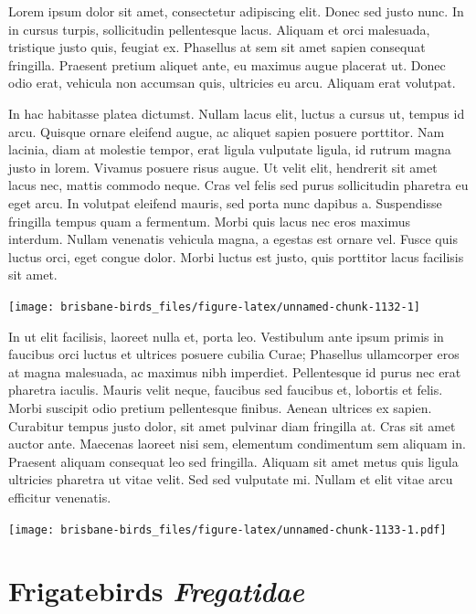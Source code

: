 \documentclass[]{book}
\let\origfigure\figure
\let\endorigfigure\endfigure
\renewenvironment{figure}[1][2] {
  \expandafter\origfigure\expandafter[H]
} {
  \endorigfigure
}
\begin{document}
Lorem ipsum dolor sit amet, consectetur adipiscing elit. Donec sed justo
nunc. In in cursus turpis, sollicitudin pellentesque lacus. Aliquam et
orci malesuada, tristique justo quis, feugiat ex. Phasellus at sem sit
amet sapien consequat fringilla. Praesent pretium aliquet ante, eu
maximus augue placerat ut. Donec odio erat, vehicula non accumsan quis,
ultricies eu arcu. Aliquam erat volutpat.

In hac habitasse platea dictumst. Nullam lacus elit, luctus a cursus ut,
tempus id arcu. Quisque ornare eleifend augue, ac aliquet sapien posuere
porttitor. Nam lacinia, diam at molestie tempor, erat ligula vulputate
ligula, id rutrum magna justo in lorem. Vivamus posuere risus augue. Ut
velit elit, hendrerit sit amet lacus nec, mattis commodo neque. Cras vel
felis sed purus sollicitudin pharetra eu eget arcu. In volutpat eleifend
mauris, sed porta nunc dapibus a. Suspendisse fringilla tempus quam a
fermentum. Morbi quis lacus nec eros maximus interdum. Nullam venenatis
vehicula magna, a egestas est ornare vel. Fusce quis luctus orci, eget
congue dolor. Morbi luctus est justo, quis porttitor lacus facilisis sit
amet.

\begin{figure}
\texttt{[image: brisbane-birds\_files/figure-latex/unnamed-chunk-1132-1]} \caption{insert figure caption}\label{fig:unnamed-chunk-1132}
\end{figure}

In ut elit facilisis, laoreet nulla et, porta leo. Vestibulum ante ipsum
primis in faucibus orci luctus et ultrices posuere cubilia Curae;
Phasellus ullamcorper eros at magna malesuada, ac maximus nibh
imperdiet. Pellentesque id purus nec erat pharetra iaculis. Mauris velit
neque, faucibus sed faucibus et, lobortis et felis. Morbi suscipit odio
pretium pellentesque finibus. Aenean ultrices ex sapien. Curabitur
tempus justo dolor, sit amet pulvinar diam fringilla at. Cras sit amet
auctor ante. Maecenas laoreet nisi sem, elementum condimentum sem
aliquam in. Praesent aliquam consequat leo sed fringilla. Aliquam sit
amet metus quis ligula ultricies pharetra ut vitae velit. Sed sed
vulputate mi. Nullam et elit vitae arcu efficitur venenatis.

\begin{figure}
\centering
\texttt{[image: brisbane-birds\_files/figure-latex/unnamed-chunk-1133-1.pdf]}
\caption{\label{fig:unnamed-chunk-1133}insert figure caption}
\end{figure}

\chapter{\texorpdfstring{Frigatebirds
\emph{Fregatidae}}{Frigatebirds Fregatidae}}\label{frigatebirds-fregatidae}
\end{document}
